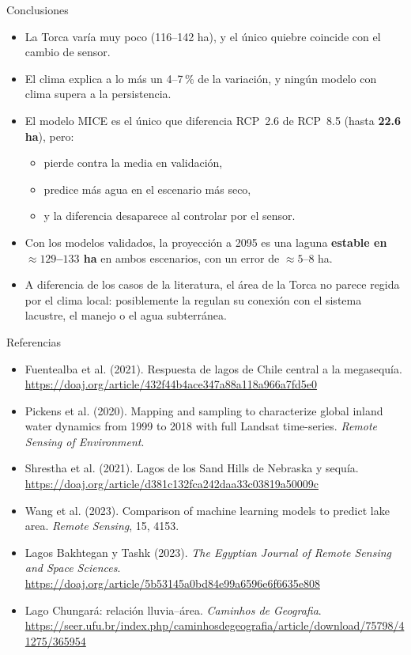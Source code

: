 \documentclass[10pt]{beamer}
\begin{document}
\begin{frame}{Conclusiones}
\begin{itemize}
\item La Torca varía muy poco (116--142 ha), y el único quiebre coincide con el cambio de sensor.
\item El clima explica a lo más un 4--7\,\% de la variación, y ningún modelo con clima supera a la persistencia.
\item El modelo MICE es el único que diferencia RCP~2.6 de RCP~8.5 (hasta \textbf{22.6 ha}), pero:
\begin{itemize}
\item pierde contra la media en validación,
\item predice más agua en el escenario más seco,
\item y la diferencia desaparece al controlar por el sensor.
\end{itemize}
\item Con los modelos validados, la proyección a 2095 es una laguna \textbf{estable en ${\approx}129$--$133$ ha} en ambos escenarios, con un error de ${\approx}5$--$8$ ha.
\item A diferencia de los casos de la literatura, el área de la Torca no parece regida por el clima local: posiblemente la regulan su conexión con el sistema lacustre, el manejo o el agua subterránea.
\end{itemize}
\end{frame}

\begin{frame}{Referencias}
\scriptsize
\begin{itemize}
\item Fuentealba et al. (2021). Respuesta de lagos de Chile central a la megasequía.\\ \url{https://doaj.org/article/432f44b4ace347a88a118a966a7fd5e0}
\item Pickens et al. (2020). Mapping and sampling to characterize global inland water dynamics from 1999 to 2018 with full Landsat time-series. \emph{Remote Sensing of Environment}.
\item Shrestha et al. (2021). Lagos de los Sand Hills de Nebraska y sequía.\\ \url{https://doaj.org/article/d381c132fca242daa33c03819a50009c}
\item Wang et al. (2023). Comparison of machine learning models to predict lake area. \emph{Remote Sensing}, 15, 4153.
\item Lagos Bakhtegan y Tashk (2023). \emph{The Egyptian Journal of Remote Sensing and Space Sciences}.\\ \url{https://doaj.org/article/5b53145a0bd84e99a6596e6f6635e808}
\item Lago Chungará: relación lluvia--área. \emph{Caminhos de Geografia}.\\ \url{https://seer.ufu.br/index.php/caminhosdegeografia/article/download/75798/41275/365954}
\end{itemize}
\end{frame}
\end{document}
